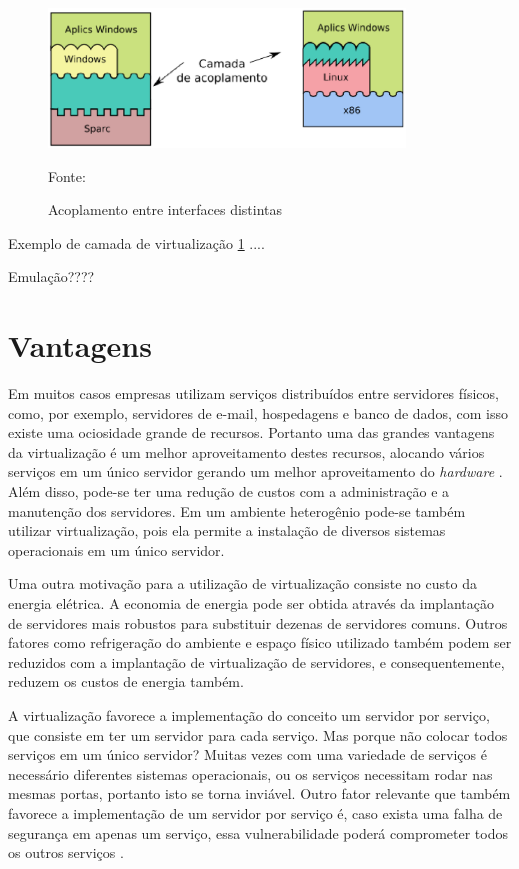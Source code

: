 \begin{figure}[acoplamento_interfaces]
 \centering
 \includegraphics[height=140px]{img/acoplamento_interfaces.eps}
 \caption{Acoplamento entre interfaces distintas}
 \label{fig:acoplamento_interfaces}
 Fonte: \citet{laureano2008}
\end{figure}
Exemplo de camada de virtualização \ref{fig:acoplamento_interfaces} ....


Emulação????


\section{Vantagens}
\label{section:vantagensvirt}

Em muitos casos empresas utilizam serviços distribuídos entre servidores físicos, como, por exemplo, servidores de e-mail, hospedagens e 
banco de dados, com isso existe uma ociosidade grande de recursos. Portanto uma das grandes vantagens da virtualização é um melhor 
aproveitamento destes recursos, alocando vários serviços em um único servidor gerando um melhor aproveitamento do \textit{hardware} 
\cite{moreira2006}. Além disso, pode-se ter uma redução de custos com a administração e a manutenção dos servidores. Em um ambiente 
heterogênio pode-se também utilizar virtualização, pois ela permite a instalação de diversos sistemas operacionais em um único servidor.

Uma outra motivação para a utilização de virtualização consiste no custo da energia elétrica. A economia de energia pode ser obtida através 
da implantação de servidores mais robustos para substituir dezenas de servidores comuns. Outros fatores como refrigeração do ambiente e 
espaço físico utilizado também podem ser reduzidos com a implantação de virtualização de servidores, e consequentemente, reduzem os 
custos de energia também.

A virtualização favorece a implementação do conceito um servidor por serviço, que consiste em ter um servidor para cada serviço.
Mas porque não colocar todos serviços em um único servidor? Muitas vezes com uma variedade de serviços é necessário diferentes 
sistemas operacionais, ou os serviços necessitam rodar nas mesmas portas, portanto isto se torna inviável. Outro fator relevante que 
também favorece a implementação de um servidor por serviço é, caso exista uma falha de segurança em apenas um serviço, essa 
vulnerabilidade poderá comprometer todos os outros serviços 
\cite{carissimi2008}.


